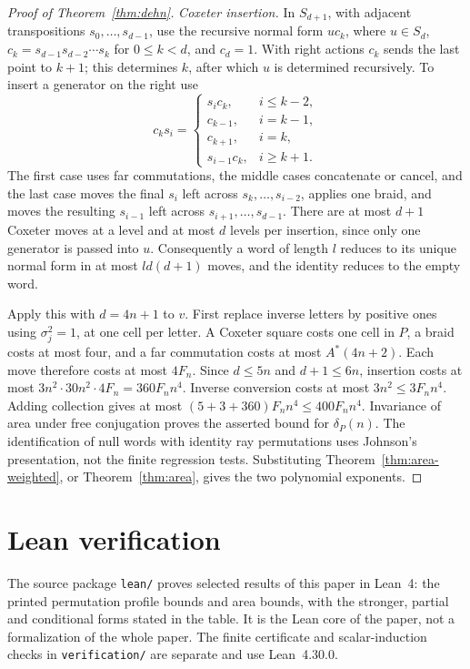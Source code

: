 \documentclass[11pt,a4paper]{article}
\theoremstyle{plain}
\theoremstyle{definition}
\theoremstyle{remark}
\begin{document}
\begin{proof}[Proof of Theorem~\ref{thm:dehn}]
\emph{Coxeter insertion.} In $S_{d+1}$, with adjacent transpositions $s_0,\ldots,s_{d-1}$, use the recursive normal form $u c_k$, where
$u\in S_d$, $c_k=s_{d-1}s_{d-2}\cdots s_k$ for $0\le k<d$, and $c_d=1$.
With right actions $c_k$ sends the last point to $k+1$; this determines $k$, after which $u$ is determined recursively.
To insert a generator on the right use
\[
c_ks_i=
\begin{cases}
s_ic_k,&i\le k-2,\\
c_{k-1},&i=k-1,\\
c_{k+1},&i=k,\\
s_{i-1}c_k,&i\ge k+1.
\end{cases}
\]
The first case uses far commutations, the middle cases concatenate or cancel, and the last case moves the final $s_i$ left across
$s_k,\ldots,s_{i-2}$, applies one braid, and moves the resulting $s_{i-1}$ left across $s_{i+1},\ldots,s_{d-1}$.
There are at most $d+1$ Coxeter moves at a level and at most $d$ levels per insertion, since only one generator is passed into $u$.
Consequently a word of length $l$ reduces to its unique normal form in at most $ld(d+1)$ moves, and the identity reduces to the empty word.

Apply this with $d=4n+1$ to $v$. First replace inverse letters by positive ones using $\sigma_j^2=1$, at one cell per letter.
A Coxeter square costs one cell in $P$, a braid costs at most four, and a far commutation costs at most $A^*(4n+2)$.
Each move therefore costs at most $4F_n$. Since $d\le5n$ and $d+1\le6n$, insertion costs at most
$3n^2\cdot30n^2\cdot4F_n=360F_nn^4$. Inverse conversion costs at most $3n^2\le3F_nn^4$.
Adding collection gives at most $(5+3+360)F_nn^4\le400F_nn^4$.
Invariance of area under free conjugation proves the asserted bound for $\delta_P(n)$.
The identification of null words with identity ray permutations uses Johnson's presentation, not the finite regression tests.
Substituting Theorem~\ref{thm:area-weighted}, or Theorem~\ref{thm:area}, gives the two polynomial exponents.
\end{proof}

\section{Lean verification}\label{app:lean}

The source package \nolinkurl{lean/} proves selected results of this paper in
Lean~4: the printed permutation profile bounds and area bounds, with the
stronger, partial and conditional forms stated in the table. It is the Lean
core of the paper, not a formalization of the whole paper. The finite
certificate and scalar-induction checks in \nolinkurl{verification/} are
separate and use Lean~4.30.0.
\end{document}
